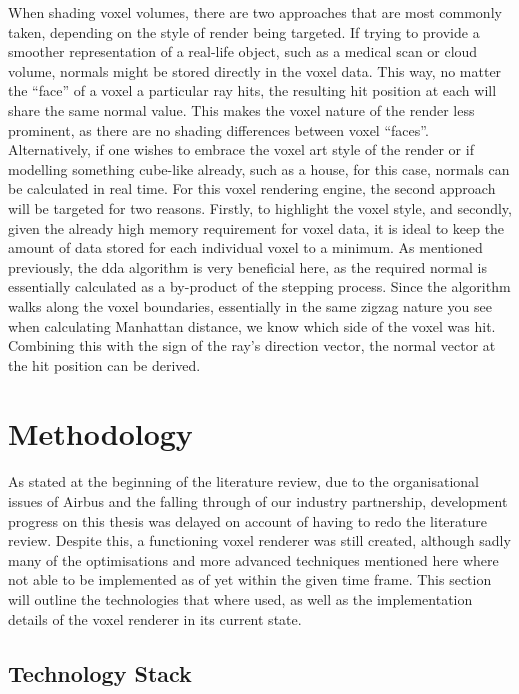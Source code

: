\documentclass[titlepage]{article}
\begin{document}
When shading voxel volumes, there are two approaches that are most commonly taken, depending on the style of render being targeted. If trying to provide a smoother representation of a real-life object, such as a medical scan or cloud volume, normals might be stored directly in the voxel data. This way, no matter the ``face'' of a voxel a particular ray hits, the resulting hit position at each will share the same normal value. This makes the voxel nature of the render less prominent, as there are no shading differences between voxel ``faces''. Alternatively, if one wishes to embrace the voxel art style of the render or if modelling something cube-like already, such as a house, for this case, normals can be calculated in real time. For this voxel rendering engine, the second approach will be targeted for two reasons. Firstly, to highlight the voxel style, and secondly, given the already high memory requirement for voxel data, it is ideal to keep the amount of data stored for each individual voxel to a minimum. As mentioned previously, the \gls{dda} algorithm is very beneficial here, as the required normal is essentially calculated as a by-product of the stepping process. Since the algorithm walks along the voxel boundaries, essentially in the same zigzag nature you see when calculating Manhattan distance, we know which side of the voxel was hit. Combining this with the sign of the ray's direction vector, the normal vector at the hit position can be derived.

\section{Methodology}

As stated at the beginning of the literature review, due to the organisational issues of Airbus and the falling through of our industry partnership, development progress on this thesis was delayed on account of having to redo the literature review. Despite this, a functioning voxel renderer was still created, although sadly many of the optimisations and more advanced techniques mentioned here where not able to be implemented as of yet within the given time frame. This section will outline the technologies that where used, as well as the implementation details of the voxel renderer in its current state.

\subsection{Technology Stack}
\end{document}
